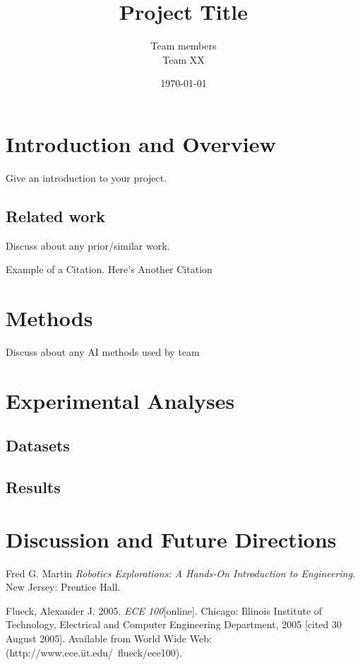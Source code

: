 \documentclass[a4paper, 10pt,twocolumn]{article}
\begin{document}
	
\title{Project Title}
\author{Team members\\Team XX} 
\date{\today}

\maketitle


 
\section{Introduction and Overview}

Give an introduction to your project. 


\subsection*{Related work}

Discuss about any prior/similar work. 

Example of a Citation\cite[p.219]{Robotics}. Here's 
Another Citation\cite{Flueck} %



\section{Methods}

Discuss about any AI methods used by team 


\section{Experimental Analyses} 

\subsection*{Datasets} 
\subsection*{Results} 

\section{Discussion and Future Directions} 

\begin{thebibliography}{9}
	

 Fred G. Martin \emph{Robotics Explorations: A 
Hands-On Introduction to Engineering}. New Jersey: Prentice Hall.

  Flueck, Alexander J. 2005. \emph{ECE 
100}[online]. Chicago: Illinois Institute of Technology, Electrical 
and Computer Engineering Department, 2005 [cited 30
August 2005]. Available from World Wide Web: (http://www.ece.iit.edu/~flueck/ece100).

\end{thebibliography}
\end{document}
